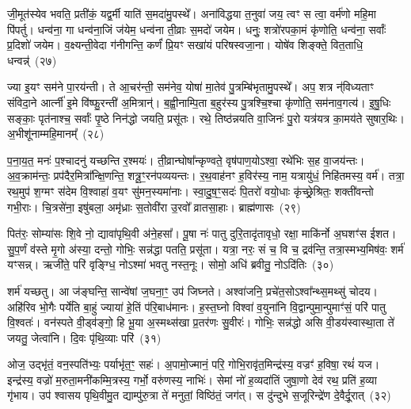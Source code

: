 {\anuvakamend[{अ॒गा॒ꣳ स॒ह॒स्रा॒क्ष॒ दे॒वाः॒ स॒हस्र॑धारा॒मत्यꣳ॑हा॒ अनु॑वर्त्मानः॒ षोड॑श च}]}%

जी॒मूत॑स्येव भवति॒ प्रती॑कं॒ यद्व॒र्मी याति॑ स॒मदा॑मु॒पस्थे᳚। अना॑विद्धया त॒नुवा॑ जय॒ त्वꣳ स त्वा॒ वर्म॑णो महि॒मा पि॑पर्तु। धन्व॑ना॒ गा धन्व॑ना॒जिं ज॑येम॒ धन्व॑ना ती॒व्राः स॒मदो॑ जयेम। धनुः॒ शत्रो॑रपका॒मं कृ॑णोति॒ धन्व॑ना॒ सर्वाः᳚ प्र॒दिशो॑ जयेम। व॒क्ष्यन्ती॒वेदा ग॑नीगन्ति॒ कर्णं॑ प्रि॒यꣳ सखा॑यं परिषस्वजा॒ना। योषे॑व शिङ्क्ते॒ वित॒ताधि॒ धन्वन्न्॑~(२७)

ज्या इ॒यꣳ सम॑ने पा॒रय॑न्ती। ते आ॒चर॑न्ती॒ सम॑नेव॒ योषा॑ मा॒तेव॑ पु॒त्रम्बि॑भृतामु॒पस्थे᳚। अप॒ शत्र न्॑विध्यताꣳ संविदा॒ने आर्त्नी॑ इ॒मे वि॑ष्फु॒रन्ती॑ अ॒मित्रान्॑। ब॒ह्वी॒नाम्पि॒ता ब॒हुर॑स्य पु॒त्रश्चि॒श्चा कृ॑णोति॒ सम॑नाव॒गत्य॑। इ॒षु॒धिः सङ्काः॒ पृत॑नाश्च॒ सर्वाः᳚ पृ॒ष्ठे निन॑द्धो जयति॒ प्रसू॑तः। रथे॒ तिष्ठ॑न्नयति वा॒जिनः॑ पु॒रो यत्र॑यत्र का॒मय॑ते सुषार॒थिः। अ॒भीशू॑नाम्महि॒मानम्᳚~(२८)

प॒ना॒य॒त॒ मनः॑ प॒श्चादनु॑ यच्छन्ति र॒श्मयः॑। ती॒व्रान्घोषा᳚न्कृण्वते॒ वृष॑पाण॒यो\-ऽश्वा॒ रथे॑भिः स॒ह वा॒जय॑न्तः। अ॒व॒क्राम॑न्तः॒ प्रप॑दैर॒मित्रा᳚न्क्षि॒णन्ति॒ शत्रू॒ꣳ॒रन॑पव्ययन्तः। र॒थ॒वाह॑नꣳ ह॒विर॑स्य॒ नाम॒ यत्रायु॑धं॒ निहि॑तमस्य॒ वर्म॑। तत्रा॒ रथ॒मुप॑ श॒ग्मꣳ स॑देम वि॒श्वाहा॑ व॒यꣳ सु॑मन॒स्यमा॑नाः। स्वा॒दु॒ष॒ꣳ॒सदः॑ पि॒तरो॑ वयो॒धाः कृ॑च्छ्रे॒श्रितः॒ शक्ती॑वन्तो गभी॒राः। चि॒त्रसे॑ना॒ इषु॑बला॒ अमृ॑ध्राः स॒तोवी॑रा उ॒रवो᳚ व्रातसा॒हाः। ब्राह्म॑णासः~(२९)

पित॑रः॒ सोम्या॑सः शि॒वे नो॒ द्यावा॑पृथि॒वी अ॑ने॒हसा᳚। पू॒षा नः॑ पातु दुरि॒तादृ॑तावृधो॒ रक्षा॒ माकि॑र्नो अ॒घशꣳ॑स ईशत। सु॒प॒र्णं व॑स्ते मृ॒गो अ॑स्या॒ दन्तो॒ गोभिः॒ सन्न॑द्धा पतति॒ प्रसू॑ता। यत्रा॒ नरः॒ सं च॒ वि च॒ द्रव॑न्ति॒ तत्रा॒स्मभ्य॒मिष॑वः॒ शर्म॑ यꣳसन्न्। ऋजी॑ते॒ परि॑ वृङ्ग्धि॒ नो\-ऽश्मा॑ भवतु नस्त॒नूः। सोमो॒ अधि॑ ब्रवीतु॒ नो\-ऽदि॑तिः~(३०)

शर्म॑ यच्छतु। आ ज॑ङ्घन्ति॒ सान्वे॑षां ज॒घना॒ꣳ॒ उप॑ जिघ्नते। अश्वा॑जनि॒ प्रचे॑त॒सो\-ऽश्वा᳚न्थ्स॒मथ्सु॑ चोदय। अहि॑रिव भो॒गैः पर्ये॑ति बा॒हुं ज्याया॑ हे॒तिं प॑रि॒बाध॑मानः। ह॒स्त॒घ्नो विश्वा॑ व॒युना॑नि वि॒द्वान्पुमा॒न्पुमाꣳ॑सं॒ परि॑ पातु वि॒श्वतः॑। वन॑स्पते वी॒ड्व॑ङ्गो॒ हि भू॒या अ॒स्मथ्स॑खा प्र॒तर॑णः सु॒वीरः॑। गोभिः॒ सन्न॑द्धो असि वी॒डय॑स्वास्था॒ता ते॑ जयतु॒ जेत्वा॑नि। दि॒वः पृ॑थि॒व्याः परि॑~(३१)

ओज॒ उद्भृ॑तं॒ वन॒स्पति॑भ्यः॒ पर्याभृ॑त॒ꣳ॒ सहः॑। अ॒पामो॒ज्मानं॒ परि॒ गोभि॒रावृ॑त॒मिन्द्र॑स्य॒ वज्रꣳ॑ ह॒विषा॒ रथं॑ यज। इन्द्र॑स्य॒ वज्रो॑ म॒रुता॒मनी॑कम्मि॒त्रस्य॒ गर्भो॒ वरु॑णस्य॒ नाभिः॑। सेमां नो॑ ह॒व्यदा॑तिं जुषा॒णो देव॑ रथ॒ प्रति॑ ह॒व्या गृ॑भाय। उप॑ श्वासय पृथि॒वीमु॒त द्याम्पु॑रु॒त्रा ते॑ मनुतां॒ विष्ठि॑तं॒ जग॑त्। स दु॑न्दुभे स॒जूरिन्द्रे॑ण दे॒वैर्दू॒रात्~(३२)

